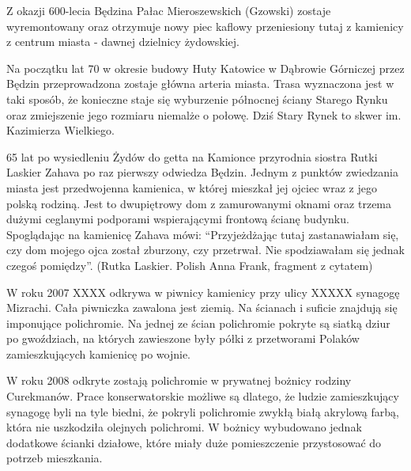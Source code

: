 \documentclass[11pt,a4paper,oneside]{article}
\begin{document}
Z okazji 600-lecia Będzina Pałac Mieroszewskich (Gzowski) zostaje wyremontowany oraz otrzymuje nowy piec kaflowy przeniesiony tutaj z kamienicy z centrum miasta - dawnej dzielnicy żydowskiej.

Na początku lat 70 w okresie budowy Huty Katowice w Dąbrowie Górniczej przez Będzin przeprowadzona zostaje główna arteria miasta. Trasa wyznaczona jest w taki sposób, że konieczne staje się wyburzenie północnej ściany Starego Rynku oraz zmiejszenie jego rozmiaru niemalże o połowę. Dziś Stary Rynek to skwer im. Kazimierza Wielkiego.

65 lat po wysiedleniu Żydów do getta na Kamionce przyrodnia siostra Rutki Laskier Zahava po raz pierwszy odwiedza Będzin. Jednym z punktów zwiedzania miasta jest przedwojenna kamienica, w której mieszkał jej ojciec wraz z jego polską rodziną. Jest to dwupiętrowy dom z zamurowanymi oknami oraz trzema dużymi ceglanymi podporami wspierającymi frontową ścianę budynku. Spoglądając na kamienicę Zahava mówi: “Przyjeżdżając tutaj zastanawiałam się, czy dom mojego ojca został zburzony, czy przetrwał. Nie spodziawałam się jednak czegoś pomiędzy”. (Rutka Laskier. Polish Anna Frank, fragment z cytatem)

W roku 2007 XXXX odkrywa w piwnicy kamienicy przy ulicy XXXXX synagogę Mizrachi. Cała piwniczka zawalona jest ziemią. Na ścianach i suficie znajdują się imponujące polichromie. Na jednej ze ścian polichromie pokryte są siatką dziur po gwoździach, na których zawieszone były półki z przetworami Polaków zamieszkujących kamienicę po wojnie.

W roku 2008 odkryte zostają polichromie w prywatnej bożnicy rodziny Curekmanów. Prace konserwatorskie możliwe są dlatego, że ludzie zamieszkujący synagogę byli na tyle biedni, że pokryli polichromie zwykłą białą akrylową farbą, która nie uszkodziła olejnych polichromi. W bożnicy wybudowano jednak dodatkowe ścianki działowe, które miały duże pomieszczenie przystosować do potrzeb mieszkania.
\end{document}
